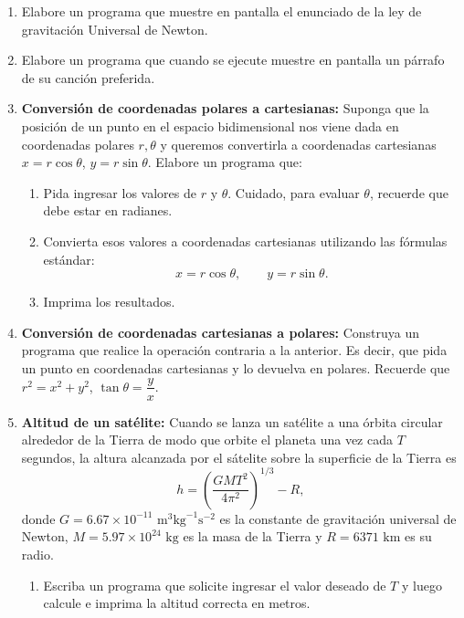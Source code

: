 \documentclass[12pt]{article}
\begin{document}
\begin{problemas}[]
\begin{enumerate}[leftmargin=*]

\item Elabore un programa que muestre en pantalla el enunciado de la ley de gravitación Universal de Newton.
\item Elabore un programa que cuando se ejecute muestre en pantalla un párrafo de su canción preferida.

\item \textbf{Conversión de coordenadas polares a cartesianas:}
Suponga que la posición de un punto en el espacio bidimensional nos viene dada en coordenadas 
polares $r, \theta$ y queremos convertirla a coordenadas cartesianas $x = r\cos\theta$, 
$y=r\sin\theta$. Elabore un programa que:
\begin{enumerate}
    \item Pida ingresar los valores de $r$ y $\theta$. Cuidado, para 
    evaluar $\theta$, recuerde que debe estar en radianes.
    \item Convierta esos valores a coordenadas cartesianas utilizando las fórmulas estándar:
    \begin{equation}
        x = r \cos \theta, \qquad y = r \sin \theta.\nonumber
    \end{equation}
    \item Imprima los resultados.
\end{enumerate}

\item \textbf{Conversión de coordenadas cartesianas a polares:}
Construya un programa que realice la operación contraria a la anterior. Es decir, que pida un punto en 
coordenadas cartesianas y lo devuelva en polares. Recuerde que $r^2 = x^2 + y^2$, $\tan \theta = \dfrac{y}{x}$.

\item \textbf{Altitud de un satélite:}
Cuando se lanza un satélite a una órbita circular alrededor de la Tierra de modo que orbite 
el planeta una vez cada $T$ segundos, la altura alcanzada por el sátelite sobre la superficie de 
la Tierra es
    \begin{equation*}
        h = \left( \frac{G M T^2}{4 \pi^2} \right)^{1/3} - R,
    \end{equation*}
donde $G = 6.67 \times 10^{-11} \text{ m}^3 \text{kg}^{-1} \text{s}^{-2}$ es 
la constante de gravitación universal de Newton, $M = 5.97 \times 10^{24} \text{ kg}$ es 
la masa de la Tierra y $R = 6371 \text{ km}$ es su radio.   
\begin{enumerate}[label=\alph*)]
    \item Escriba un programa que solicite ingresar el valor deseado de $T$ y 
    luego calcule e imprima la altitud correcta en metros.


\end{enumerate}
\end{enumerate}
\end{problemas}
\end{document}
